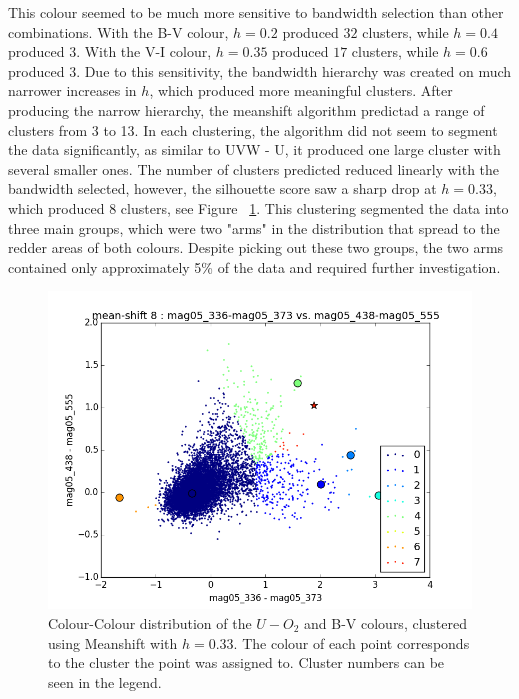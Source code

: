 This colour seemed to be much more sensitive to bandwidth selection than other combinations.
With the B-V colour, $h=0.2$ produced $32$ clusters, while $h=0.4$ produced $3$. With the V-I colour, $h=0.35$ produced $17$ clusters, while $h=0.6$ produced $3$.
Due to this sensitivity, the bandwidth hierarchy was created on much narrower increases in $h$, which produced more meaningful clusters.
After producing the narrow hierarchy, the meanshift algorithm predictad a range of clusters from 3 to 13.
In each clustering, the algorithm did not seem to segment the data significantly, as similar to UVW - U, it produced one large cluster with several smaller ones.
The number of clusters predicted reduced linearly with the bandwidth selected, however, the silhouette score saw a sharp drop at $h = 0.33$, which produced 8 clusters, see Figure ~\ref{fig:UOIIMS}. 
This clustering segmented the data into three main groups, which were two "arms" in the distribution that spread to the redder areas of both colours.
Despite picking out these two groups, the two arms contained only approximately 5\% of the data and required further investigation. 

\begin{figure}
\centering
\includegraphics[width=\linewidth]{figs/meanshift_color_8cl_mag05_336-mag05_373vsmag05_438-mag05_555}
\caption{Colour-Colour distribution of the $U-O_{2}$ and B-V colours, clustered using Meanshift with $h=0.33$. The colour of each point corresponds to the cluster the point was assigned to. Cluster numbers can be seen in the legend.}
\label{fig:UOIIMS}
\end{figure}

